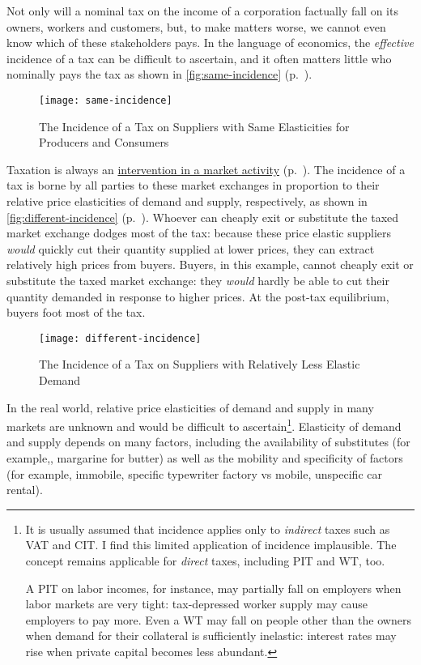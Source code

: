 Not only will a nominal tax on the income of a corporation factually fall on its owners, workers and customers, but, to make matters worse, we cannot even know which of these stakeholders pays. In the language of economics, the \emph{effective} incidence of a tax can be difficult to ascertain, and it often matters little who nominally pays the tax as shown in \autoref{fig:same-incidence} (p.~\pageref{fig:same-incidence}). 

 \begin{figure}[htbp]
	\centering
	\texttt{[image: same-incidence]}  
	\caption[Incidence of a Tax on Suppliers with Unit-Elastic Supply and Demand]{The Incidence of a Tax on Suppliers with Same Elasticities for Producers and Consumers}
	\label{fig:same-incidence}
\end{figure}

Taxation is always an \hyperref[sec:market-vs-command]{intervention in a market activity} (p.~\pageref{sec:market-vs-command}). The incidence of a tax is borne by all parties to these market exchanges in proportion to their relative price elasticities of demand and supply, respectively, as shown in \autoref{fig:different-incidence} (p.~\pageref{fig:different-incidence}). Whoever can cheaply exit or substitute the taxed market exchange dodges most of the tax: because these price elastic suppliers \emph{would} quickly cut their quantity supplied at lower prices, they can extract relatively high prices from buyers. Buyers, in this example, cannot cheaply exit or substitute the taxed market exchange: they \emph{would} hardly be able to cut their quantity demanded in response to higher prices. At the post-tax equilibrium, buyers foot most of the tax.

 \begin{figure}[htbp]
	\centering
	\texttt{[image: different-incidence]}  
	\caption[Incidence of a Tax on Suppliers with Relatively Inelastic Demand]{The Incidence of a Tax on Suppliers with Relatively Less Elastic Demand}
	\label{fig:different-incidence}
\end{figure}

In the real world, relative price elasticities of demand and supply in many markets are unknown and would be difficult to ascertain\footnote{
	It is usually assumed that incidence applies only to \emph{indirect} taxes such as \gls{VAT} and \gls{CIT}. I find this limited application of incidence implausible. The concept remains applicable for \emph{direct} taxes, including \gls{PIT} and \gls{WT}, too. 
	
	A \gls{PIT} on labor incomes, for instance, may partially fall on employers when labor markets are very tight: tax-depressed worker supply may cause employers to pay more. Even a \gls{WT} may fall on people other than the owners when demand for their collateral is sufficiently inelastic: interest rates may rise when private capital becomes less abundant.}. 
Elasticity of demand and supply depends on many factors, including the availability of substitutes (for example,, margarine for butter) as well as the mobility and specificity of factors (for example, immobile, specific typewriter factory vs mobile, unspecific car rental).

